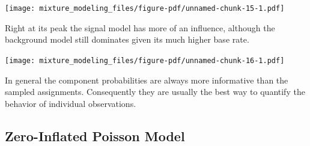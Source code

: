 \documentclass[
  letterpaper,
  DIV=11,
  numbers=noendperiod]{scrartcl}
\newenvironment{Shaded}{\begin{snugshade}}{\end{snugshade}}
\newcommand{\AttributeTok}[1]{\textcolor[rgb]{0.40,0.45,0.13}{#1}}
\newcommand{\DecValTok}[1]{\textcolor[rgb]{0.68,0.00,0.00}{#1}}
\newcommand{\FunctionTok}[1]{\textcolor[rgb]{0.28,0.35,0.67}{#1}}
\newcommand{\NormalTok}[1]{\textcolor[rgb]{0.00,0.23,0.31}{#1}}
\newcommand{\OtherTok}[1]{\textcolor[rgb]{0.00,0.23,0.31}{#1}}
\newcommand{\SpecialCharTok}[1]{\textcolor[rgb]{0.37,0.37,0.37}{#1}}
\begin{document}
\begin{Shaded}
\end{Shaded}

\texttt{[image: mixture\_modeling\_files/figure-pdf/unnamed-chunk-15-1.pdf]}

Right at its peak the signal model has more of an influence, although
the background model still dominates given its much higher base rate.

\begin{Shaded}
\end{Shaded}

\texttt{[image: mixture\_modeling\_files/figure-pdf/unnamed-chunk-16-1.pdf]}

In general the component probabilities are always more informative than
the sampled assignments. Consequently they are usually the best way to
quantify the behavior of individual observations.

\subsection{Zero-Inflated Poisson
Model}\label{zero-inflated-poisson-model}
\end{document}
